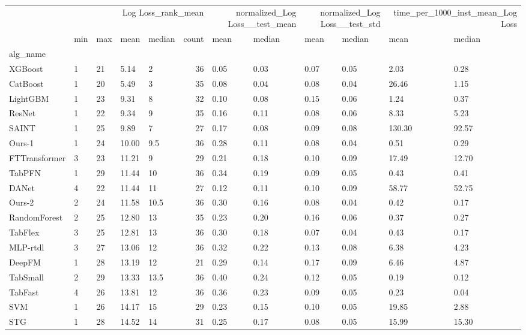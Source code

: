\begin{tabular}{lllllrllllll}
\toprule
 & \multicolumn{5}{r}{Log Loss_rank_mean} & \multicolumn{2}{r}{normalized_Log Loss__test_mean} & \multicolumn{2}{r}{normalized_Log Loss__test_std} & \multicolumn{2}{r}{time_per_1000_inst_mean_Log Loss} \\
 & min & max & mean & median & count & mean & median & mean & median & mean & median \\
alg_name &  &  &  &  &  &  &  &  &  &  &  \\
\midrule
XGBoost & 1 & 21 & 5.14 & 2 & 36 & 0.05 & 0.03 & 0.07 & 0.05 & 2.03 & 0.28 \\
CatBoost & 1 & 20 & 5.49 & 3 & 35 & 0.08 & 0.04 & 0.08 & 0.04 & 26.46 & 1.15 \\
LightGBM & 1 & 23 & 9.31 & 8 & 32 & 0.10 & 0.08 & 0.15 & 0.06 & 1.24 & 0.37 \\
ResNet & 1 & 22 & 9.34 & 9 & 35 & 0.16 & 0.11 & 0.08 & 0.06 & 8.33 & 5.23 \\
SAINT & 1 & 25 & 9.89 & 7 & 27 & 0.17 & 0.08 & 0.09 & 0.08 & 130.30 & 92.57 \\
Ours-1 & 1 & 24 & 10.00 & 9.5 & 36 & 0.28 & 0.11 & 0.08 & 0.04 & 0.51 & 0.29 \\
FTTransformer & 3 & 23 & 11.21 & 9 & 29 & 0.21 & 0.18 & 0.10 & 0.09 & 17.49 & 12.70 \\
TabPFN & 1 & 29 & 11.44 & 10 & 36 & 0.34 & 0.19 & 0.09 & 0.05 & 0.43 & 0.41 \\
DANet & 4 & 22 & 11.44 & 11 & 27 & 0.12 & 0.11 & 0.10 & 0.09 & 58.77 & 52.75 \\
Ours-2 & 2 & 24 & 11.58 & 10.5 & 36 & 0.30 & 0.16 & 0.08 & 0.04 & 0.42 & 0.17 \\
RandomForest & 2 & 25 & 12.80 & 13 & 35 & 0.23 & 0.20 & 0.16 & 0.06 & 0.37 & 0.27 \\
TabFlex & 3 & 25 & 12.81 & 13 & 36 & 0.30 & 0.18 & 0.07 & 0.04 & 0.43 & 0.17 \\
MLP-rtdl & 3 & 27 & 13.06 & 12 & 36 & 0.32 & 0.22 & 0.13 & 0.08 & 6.38 & 4.23 \\
DeepFM & 1 & 28 & 13.19 & 12 & 21 & 0.29 & 0.14 & 0.17 & 0.09 & 6.46 & 4.87 \\
TabSmall & 2 & 29 & 13.33 & 13.5 & 36 & 0.40 & 0.24 & 0.12 & 0.05 & 0.19 & 0.12 \\
TabFast & 4 & 26 & 13.81 & 12 & 36 & 0.36 & 0.23 & 0.09 & 0.05 & 0.23 & 0.04 \\
SVM & 1 & 26 & 14.17 & 15 & 29 & 0.23 & 0.15 & 0.10 & 0.05 & 19.85 & 2.88 \\
STG & 1 & 28 & 14.52 & 14 & 31 & 0.25 & 0.17 & 0.08 & 0.05 & 15.99 & 15.30 \\

\end{tabular}
